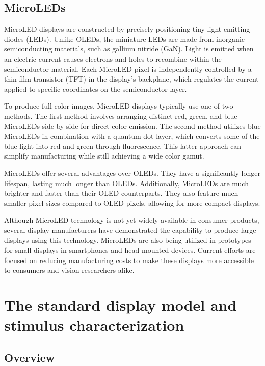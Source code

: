 \documentclass[
  letterpaper,
]{book}
\begin{document}
\subsection{MicroLEDs}\label{microleds}

MicroLED displays are constructed by precisely positioning tiny
light-emitting diodes (LEDs). Unlike OLEDs, the miniature LEDs are made
from inorganic semiconducting materials, such as gallium nitride (GaN).
Light is emitted when an electric current causes electrons and holes to
recombine within the semiconductor material. Each MicroLED pixel is
independently controlled by a thin-film transistor (TFT) in the
display's backplane, which regulates the current applied to specific
coordinates on the semiconductor layer.

To produce full-color images, MicroLED displays typically use one of two
methods. The first method involves arranging distinct red, green, and
blue MicroLEDs side-by-side for direct color emission. The second method
utilizes blue MicroLEDs in combination with a quantum dot layer, which
converts some of the blue light into red and green through fluorescence.
This latter approach can simplify manufacturing while still achieving a
wide color gamut.

MicroLEDs offer several advantages over OLEDs. They have a significantly
longer lifespan, lasting much longer than OLEDs. Additionally, MicroLEDs
are much brighter and faster than their OLED counterparts. They also
feature much smaller pixel sizes compared to OLED pixels, allowing for
more compact displays.

Although MicroLED technology is not yet widely available in consumer
products, several display manufacturers have demonstrated the capability
to produce large displays using this technology. MicroLEDs are also
being utilized in prototypes for small displays in smartphones and
head-mounted devices. Current efforts are focused on reducing
manufacturing costs to make these displays more accessible to consumers
and vision researchers alike.

\section{The standard display model and stimulus
characterization}\label{the-standard-display-model-and-stimulus-characterization}

\subsection{Overview}\label{overview}
\end{document}
